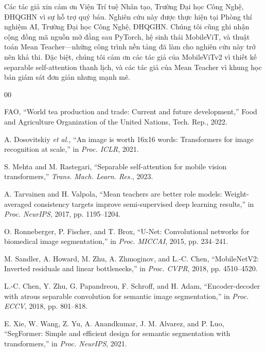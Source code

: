 \documentclass[conference]{IEEEtran}
\begin{document}
Các tác giả xin cảm ơn Viện Trí tuệ Nhân tạo, Trường Đại học Công Nghệ, ĐHQGHN vì sự hỗ trợ quý báu. Nghiên cứu này được thực hiện tại Phòng thí nghiệm AI, Trường Đại học Công Nghệ, ĐHQGHN. Chúng tôi cũng ghi nhận cộng đồng mã nguồn mở đằng sau PyTorch, hệ sinh thái MobileViT, và thuật toán Mean Teacher---những công trình nền tảng đã làm cho nghiên cứu này trở nên khả thi. Đặc biệt, chúng tôi cảm ơn các tác giả của MobileViTv2 vì thiết kế separable self-attention thanh lịch, và các tác giả của Mean Teacher vì khung học bán giám sát đơn giản nhưng mạnh mẽ.


\begin{thebibliography}{00}

FAO, ``World tea production and trade: Current and future development,'' Food and Agriculture Organization of the United Nations, Tech. Rep., 2022.

A. Dosovitskiy \textit{et al.}, ``An image is worth 16x16 words: Transformers for image recognition at scale,'' in \textit{Proc. ICLR}, 2021.

S. Mehta and M. Rastegari, ``Separable self-attention for mobile vision transformers,'' \textit{Trans. Mach. Learn. Res.}, 2023.

A. Tarvainen and H. Valpola, ``Mean teachers are better role models: Weight-averaged consistency targets improve semi-supervised deep learning results,'' in \textit{Proc. NeurIPS}, 2017, pp. 1195--1204.

O. Ronneberger, P. Fischer, and T. Brox, ``U-Net: Convolutional networks for biomedical image segmentation,'' in \textit{Proc. MICCAI}, 2015, pp. 234--241.

M. Sandler, A. Howard, M. Zhu, A. Zhmoginov, and L.-C. Chen, ``MobileNetV2: Inverted residuals and linear bottlenecks,'' in \textit{Proc. CVPR}, 2018, pp. 4510--4520.

L.-C. Chen, Y. Zhu, G. Papandreou, F. Schroff, and H. Adam, ``Encoder-decoder with atrous separable convolution for semantic image segmentation,'' in \textit{Proc. ECCV}, 2018, pp. 801--818.

E. Xie, W. Wang, Z. Yu, A. Anandkumar, J. M. Alvarez, and P. Luo, ``SegFormer: Simple and efficient design for semantic segmentation with transformers,'' in \textit{Proc. NeurIPS}, 2021.


\end{thebibliography}
\end{document}
